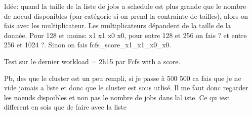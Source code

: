 \documentclass[a4paper]{article}
\begin{document}


Idée: quand la taille de la liste de jobs a schedule est plus grande que le nombre de noeud disponibles (par catégorie si on prend la contrainte de tailles), alors on fais
avec les multiplicateur. Les multiplicateurs dépandent de la taille de la donnée. Pour 128 et moins: x1 x1 x0 x0, pour entre 128 et 256 on fais ? et entre 256 et 1024 ?.
Sinon on fais fcfs\_score\_x1\_x1\_x0\_x0.

Test sur le dernier workload = 2h15 par Fcfs with a score.

Pb, des que le cluster est un peu rempli, si je passe à 500 500 ca fais que je ne vide jamais a liste et donc 
que le cluster est sous utlisé. Il me faut donc regarder les noeuds dispoibles et non pas le nombre de jobs dans lal iste.
Ce qu iest different en sois que de faire avec la liste
\end{document}
